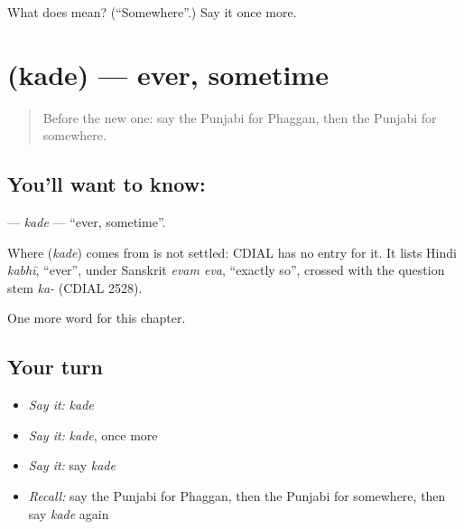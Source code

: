 \begin{tcolorbox}[breakable,colback=teal!4,colframe=teal!35!black,title={Before you move on}]
What does  mean? (\textquotedblleft{}Somewhere\textquotedblright{}.) Say it once more.
\end{tcolorbox}
\section[\texorpdfstring{\pa{ਕਦੇ} (kade)}{ਕਦੇ (kade)}]{ (kade) — ever, sometime}

\label{lesson:PA-C106-kade}



\begin{quote}
Before the new one: say the Punjabi for Phaggan, then the Punjabi for somewhere.
\end{quote}

\subsection*{You'll want to know: }
\textbf{} — \emph{kade} — \textquotedblleft{}ever, sometime\textquotedblright{}.

\begin{cousinweb}
Where \textbf{} (\emph{kade}) comes from is not settled: CDIAL has no entry for it. It lists Hindi \emph{kabhī}, \textquotedblleft{}ever\textquotedblright{}, under Sanskrit \emph{evam eva}, \textquotedblleft{}exactly so\textquotedblright{}, crossed with the question stem \emph{ka-} (CDIAL 2528).
\end{cousinweb}

\begin{grammarlens}[title={What you've built}]
One more word for this chapter.
\end{grammarlens}

\subsection*{Your turn}
\begin{itemize}
\raggedright
  \item \emph{Say it:} \emph{kade}
  \item \emph{Say it:} \emph{kade}, once more
  \item \emph{Say it:} say \emph{kade}
  \item \emph{Recall:} say the Punjabi for Phaggan, then the Punjabi for somewhere, then say \emph{kade} again
\end{itemize}

